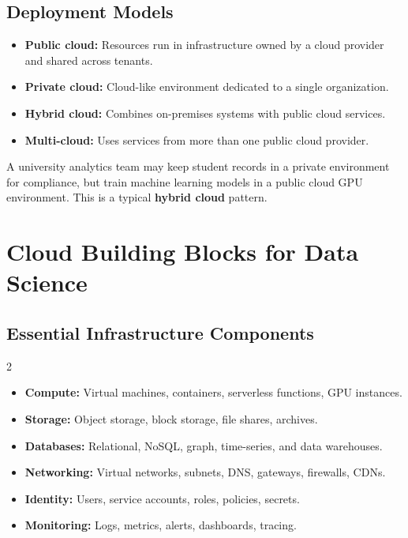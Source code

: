 \documentclass[11pt,a4paper]{article}
\begin{document}
\subsection{Deployment Models}

\begin{itemize}[leftmargin=*]
  \item \textbf{Public cloud:} Resources run in infrastructure owned by a cloud provider and shared across tenants.
  \item \textbf{Private cloud:} Cloud-like environment dedicated to a single organization.
  \item \textbf{Hybrid cloud:} Combines on-premises systems with public cloud services.
  \item \textbf{Multi-cloud:} Uses services from more than one public cloud provider.
\end{itemize}

\begin{examplebox}
A university analytics team may keep student records in a private environment for compliance, but train machine learning models in a public cloud GPU environment. This is a typical \textbf{hybrid cloud} pattern.
\end{examplebox}

\section{Cloud Building Blocks for Data Science}

\subsection{Essential Infrastructure Components}

\begin{multicols}{2}
\begin{itemize}[leftmargin=1.2em]
  \item \textbf{Compute:} Virtual machines, containers, serverless functions, GPU instances.
  \item \textbf{Storage:} Object storage, block storage, file shares, archives.
  \item \textbf{Databases:} Relational, NoSQL, graph, time-series, and data warehouses.
  \item \textbf{Networking:} Virtual networks, subnets, DNS, gateways, firewalls, CDNs.
  \item \textbf{Identity:} Users, service accounts, roles, policies, secrets.
  \item \textbf{Monitoring:} Logs, metrics, alerts, dashboards, tracing.
\end{itemize}
\end{multicols}
\end{document}
